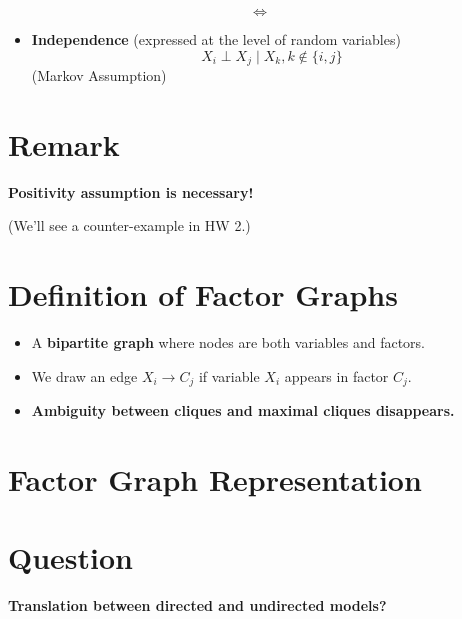 \documentclass{article}%
\begin{document}
\[
\Longleftrightarrow
\]

\begin{itemize}
    \item \textbf{Independence} (expressed at the level of random variables)
    \[
    X_i \perp X_j \mid X_{k}, k \notin \{i,j\}
    \]
    (Markov Assumption)
\end{itemize}

\section*{Remark}

\textbf{Positivity assumption is necessary!} 

(We'll see a counter-example in HW 2.)


\section*{Definition of Factor Graphs}

\begin{itemize}
    \item A \textbf{bipartite graph} where nodes are both variables and factors.
    \item We draw an edge \( X_i \to C_j \) if variable \( X_i \) appears in factor \( C_j \).
    \item \textbf{Ambiguity between cliques and maximal cliques disappears.}
\end{itemize}

\section*{Factor Graph Representation}

\begin{center}
\end{center}

\section*{Question}
\textbf{Translation between directed and undirected models?}
\end{document}
